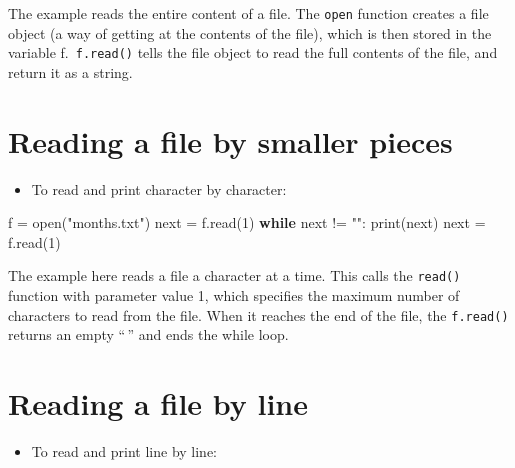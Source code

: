 \documentclass[
  letterpaper,
]{scrbook}
\newenvironment{Shaded}{\begin{snugshade}}{\end{snugshade}}
\newcommand{\BuiltInTok}[1]{\textcolor[rgb]{0.00,0.23,0.31}{#1}}
\newcommand{\ControlFlowTok}[1]{\textcolor[rgb]{0.00,0.23,0.31}{\textbf{#1}}}
\newcommand{\DecValTok}[1]{\textcolor[rgb]{0.68,0.00,0.00}{#1}}
\newcommand{\NormalTok}[1]{\textcolor[rgb]{0.00,0.23,0.31}{#1}}
\newcommand{\OperatorTok}[1]{\textcolor[rgb]{0.37,0.37,0.37}{#1}}
\newcommand{\StringTok}[1]{\textcolor[rgb]{0.13,0.47,0.30}{#1}}
\providecommand{\tightlist}{%
  \setlength{\itemsep}{0pt}\setlength{\parskip}{0pt}}
\begin{document}
The example reads the entire content of a file. The \texttt{open}
function creates a file object (a way of getting at the contents of the
file), which is then stored in the variable f.~\texttt{f.read()} tells
the file object to read the full contents of the file, and return it as
a string.

\section*{Reading a file by smaller
pieces}\label{reading-a-file-by-smaller-pieces}


\begin{itemize}
\tightlist
\item
  To read and print character by character:
\end{itemize}

\begin{Shaded}
\begin{Highlighting}[]
\NormalTok{f }\OperatorTok{=} \BuiltInTok{open}\NormalTok{(}\StringTok{"months.txt"}\NormalTok{)}
\BuiltInTok{next} \OperatorTok{=}\NormalTok{ f.read(}\DecValTok{1}\NormalTok{)}
\ControlFlowTok{while} \BuiltInTok{next} \OperatorTok{!=} \StringTok{""}\NormalTok{:}
    \BuiltInTok{print}\NormalTok{(}\BuiltInTok{next}\NormalTok{)}
    \BuiltInTok{next} \OperatorTok{=}\NormalTok{ f.read(}\DecValTok{1}\NormalTok{)}
\end{Highlighting}
\end{Shaded}

The example here reads a file a character at a time. This calls the
\texttt{read()} function with parameter value 1, which specifies the
maximum number of characters to read from the file. When it reaches the
end of the file, the \texttt{f.read()} returns an empty ``\,'' and ends
the while loop.

\section*{Reading a file by line}\label{reading-a-file-by-line}


\begin{itemize}
\tightlist
\item
  To read and print line by line:
\end{itemize}
\end{document}
